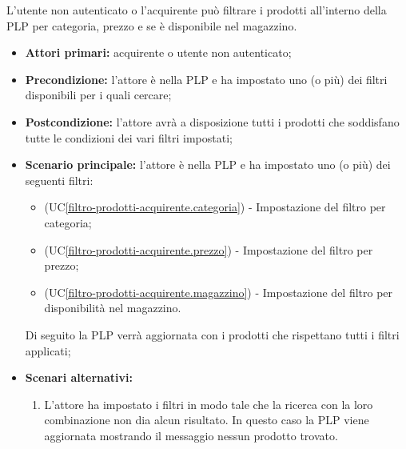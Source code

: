 L'utente non autenticato o l'acquirente può filtrare i prodotti all'interno della PLP per categoria, prezzo e se è disponibile nel magazzino.
\begin{itemize}
    \item \textbf{Attori primari:} acquirente o utente non autenticato;
    \item \textbf{Precondizione:} l'attore è nella PLP e ha impostato uno (o più) dei filtri disponibili per i quali cercare;
    \item \textbf{Postcondizione:} l'attore avrà a disposizione tutti i prodotti che soddisfano tutte le condizioni dei vari filtri impostati;
    \item \textbf{Scenario principale:} l'attore è nella PLP e ha impostato uno (o più) dei seguenti filtri:
    \begin{itemize}
        \item (UC\ref{filtro-prodotti-acquirente.categoria}) - Impostazione del filtro per categoria;
        \item (UC\ref{filtro-prodotti-acquirente.prezzo}) - Impostazione del filtro per prezzo;
        \item (UC\ref{filtro-prodotti-acquirente.magazzino}) - Impostazione del filtro per disponibilità nel magazzino.
    \end{itemize}
    Di seguito la PLP verrà aggiornata con i prodotti che rispettano tutti i filtri applicati;
    \item \textbf{Scenari alternativi:}
    \begin{enumerate}[label=\lett]
        \item L'attore ha impostato i filtri in modo tale che la ricerca con la loro combinazione non dia alcun risultato. In questo caso la PLP viene aggiornata mostrando il messaggio nessun prodotto trovato.
    \end{enumerate}
\end{itemize}

\label{filtro-prodotti-acquirente.categoria}

